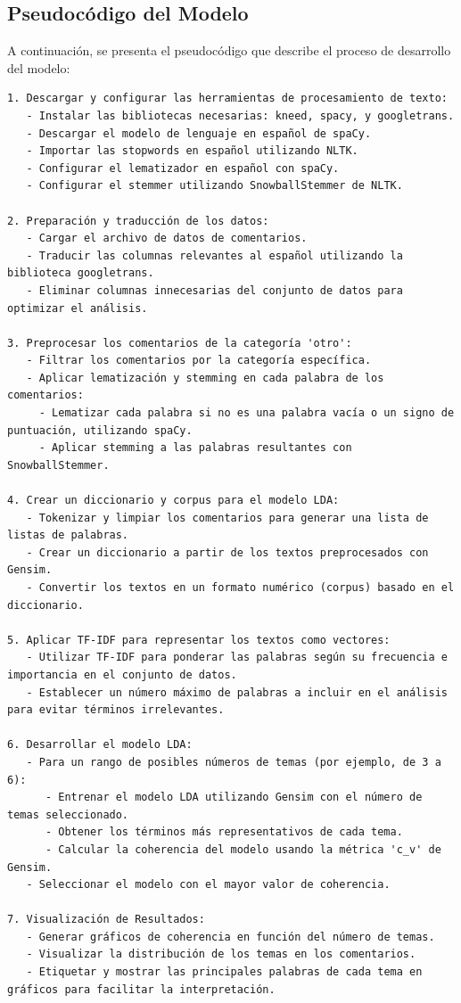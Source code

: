\documentclass{matematicasud}
\begin{document}
\subsection{Pseudocódigo del Modelo}

A continuación, se presenta el pseudocódigo que describe el proceso de desarrollo del modelo:

\begin{verbatim}
1. Descargar y configurar las herramientas de procesamiento de texto:
   - Instalar las bibliotecas necesarias: kneed, spacy, y googletrans.
   - Descargar el modelo de lenguaje en español de spaCy.
   - Importar las stopwords en español utilizando NLTK.
   - Configurar el lematizador en español con spaCy.
   - Configurar el stemmer utilizando SnowballStemmer de NLTK.

2. Preparación y traducción de los datos:
   - Cargar el archivo de datos de comentarios.
   - Traducir las columnas relevantes al español utilizando la biblioteca googletrans.
   - Eliminar columnas innecesarias del conjunto de datos para optimizar el análisis.

3. Preprocesar los comentarios de la categoría 'otro':
   - Filtrar los comentarios por la categoría específica.
   - Aplicar lematización y stemming en cada palabra de los comentarios:
     - Lematizar cada palabra si no es una palabra vacía o un signo de puntuación, utilizando spaCy.
     - Aplicar stemming a las palabras resultantes con SnowballStemmer.

4. Crear un diccionario y corpus para el modelo LDA:
   - Tokenizar y limpiar los comentarios para generar una lista de listas de palabras.
   - Crear un diccionario a partir de los textos preprocesados con Gensim.
   - Convertir los textos en un formato numérico (corpus) basado en el diccionario.

5. Aplicar TF-IDF para representar los textos como vectores:
   - Utilizar TF-IDF para ponderar las palabras según su frecuencia e importancia en el conjunto de datos.
   - Establecer un número máximo de palabras a incluir en el análisis para evitar términos irrelevantes.

6. Desarrollar el modelo LDA:
   - Para un rango de posibles números de temas (por ejemplo, de 3 a 6):
      - Entrenar el modelo LDA utilizando Gensim con el número de temas seleccionado.
      - Obtener los términos más representativos de cada tema.
      - Calcular la coherencia del modelo usando la métrica 'c_v' de Gensim.
   - Seleccionar el modelo con el mayor valor de coherencia.

7. Visualización de Resultados:
   - Generar gráficos de coherencia en función del número de temas.
   - Visualizar la distribución de los temas en los comentarios.
   - Etiquetar y mostrar las principales palabras de cada tema en gráficos para facilitar la interpretación.
\end{verbatim}
\end{document}

